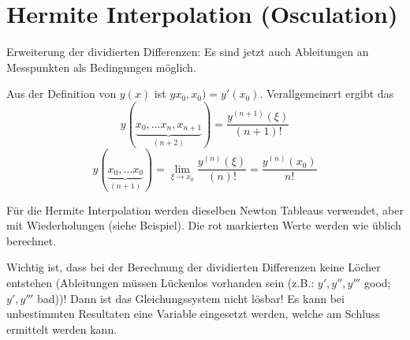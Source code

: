 \section{Hermite Interpolation (Osculation)}
Erweiterung der dividierten Differenzen: Es sind jetzt auch Ableitungen an Messpunkten als 
Bedingungen möglich.

Aus der Definition von $y(x)$ ist $yx_0,x_0) = y'(x_0)$. Verallgemeinert ergibt das
\[y(\underbrace{x_0, \ldots x_n, x_{n+1}}_{(n+2)}) = \frac{y^{(n+1)}(\xi)}{(n+1)!}\]
\[y(\underbrace{x_0, \ldots x_0}_{(n+1)}) = \lim_{\xi \rightarrow x_0} \frac{y^{(n)}(\xi)}{(n)!} = \frac{y^{(n)}(x_0)}{n!}\]

Für die Hermite Interpolation werden dieselben Newton Tableaus verwendet, aber mit Wiederholungen (siehe Beispiel).
Die rot markierten Werte werden wie üblich berechnet.

Wichtig ist, dass bei der Berechnung der dividierten Differenzen keine Löcher entstehen (Ableitungen müssen Lückenlos vorhanden sein (z.B.: $y',y'',y'''$ good; $y',y'''$ bad))! Dann ist das 
Gleichungssystem nicht lösbar! Es kann bei unbestimmten Resultaten eine Variable eingesetzt werden,
welche am Schluss ermittelt werden kann.

